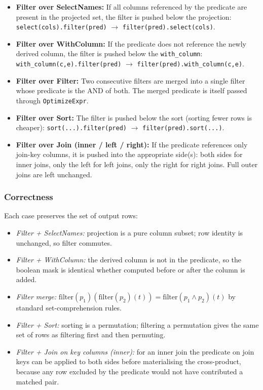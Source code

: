 \documentclass[12pt,a4paper]{article}
\begin{document}
\begin{itemize}[leftmargin=1.5em]
  \item \textbf{Filter over SelectNames:} If all columns referenced by the
        predicate are present in the projected set, the filter is pushed
        below the projection: \texttt{select(cols).filter(pred)} $\to$
        \texttt{filter(pred).select(cols)}.

  \item \textbf{Filter over WithColumn:} If the predicate does not
        reference the newly derived column, the filter is pushed below the
        \texttt{with\_column}: \texttt{with\_column(c,e).filter(pred)} $\to$
        \texttt{filter(pred).with\_column(c,e)}.

  \item \textbf{Filter over Filter:} Two consecutive filters are merged
        into a single filter whose predicate is the AND of both.  The merged
        predicate is itself passed through \texttt{OptimizeExpr}.

  \item \textbf{Filter over Sort:} The filter is pushed below the sort
        (sorting fewer rows is cheaper): \texttt{sort(...).filter(pred)}
        $\to$ \texttt{filter(pred).sort(...)}.

  \item \textbf{Filter over Join (inner / left / right):} If the predicate
        references only join-key columns, it is pushed into the appropriate
        side(s): both sides for inner joins, only the left for left joins,
        only the right for right joins.  Full outer joins are left
        unchanged.
\end{itemize}

\subsubsection*{Correctness}

Each case preserves the set of output rows:

\begin{itemize}[leftmargin=1.5em]
  \item \emph{Filter + SelectNames:} projection is a pure column subset;
        row identity is unchanged, so filter commutes.
  \item \emph{Filter + WithColumn:} the derived column is not in the
        predicate, so the boolean mask is identical whether computed before
        or after the column is added.
  \item \emph{Filter merge:} $\text{filter}(p_1)(\text{filter}(p_2)(t)) =
        \text{filter}(p_1 \wedge p_2)(t)$ by standard set-comprehension
        rules.
  \item \emph{Filter + Sort:} sorting is a permutation; filtering a
        permutation gives the same set of rows as filtering first and then
        permuting.
  \item \emph{Filter + Join on key columns (inner):} for an inner join the
        predicate on join keys can be applied to both sides before
        materialising the cross-product, because any row excluded by the
        predicate would not have contributed a matched pair.
\end{itemize}
\end{document}
